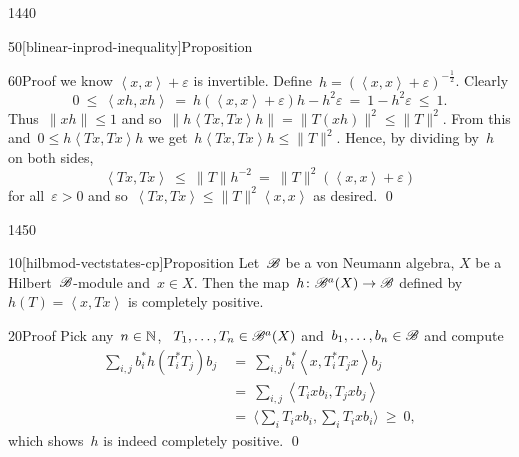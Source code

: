 \begin{parsec}{1440}
\begin{point}{50}[blinear-inprod-inequality]{Proposition}
\begin{point}{60}{Proof}
    we know $\left<x,x\right> + \varepsilon$ is invertible.
Define~$h = (\left<x,x\right> + \varepsilon)^{-\frac{1}{2}}$.
Clearly
\begin{equation*}
0 \ \leq\  \left<xh,xh\right>
    \ =\  h (\left<x,x\right> + \varepsilon)h - h^2 \varepsilon
    \ =\  1 - h^2 \varepsilon \ \leq\  1.
\end{equation*}
Thus~$\|xh\| \leq 1$
and so~$\|h\left<Tx, Tx\right>h\| = \|T(xh)\|^2 \leq \|T\|^2$.
From this and~$0 \leq h\left<Tx,Tx\right>h$
we get~$h\left<Tx,Tx\right>h \leq \|T\|^2$. Hence, by dividing by~$h$
    on both sides,
\begin{equation*}
\left<Tx,Tx\right> \ \leq \ \|T\| h^{-2}\  =
    \  \|T\|^2(\left<x,x\right> + \varepsilon)
\end{equation*}
for all~$\varepsilon > 0$
and so~$\left<Tx,Tx\right> \leq \|T\|^2 \left<x,x\right>$ as desired. \qed
\end{point}
\end{point}
\end{parsec}

\begin{parsec}{1450}%
\begin{point}{10}[hilbmod-vectstates-cp]{Proposition}%
Let~$\mathscr{B}$ be a von Neumann algebra,
    $X$ be a Hilbert~$\mathscr{B}$-module
    and~$x \in X$.
Then the map~$h\colon \mathscr{B}^a(X )\to \mathscr{B}$
defined by~$h(T) = \left<x,Tx\right>$
is completely positive.
\begin{point}{20}{Proof}%
Pick any~$n \in \mathbb{N}$, ~$T_1, \ldots, T_n \in \mathscr{B}^a(X)$
    and~$b_1, \ldots, b_n \in \mathscr{B}$
    and compute
\begin{align*}
\sum_{i,j} b_i^* h(T_i^*T_j)b_j
&\ =\ \sum_{i,j} b_i^* \left<x,T_i^*T_j x\right> b_j\\
&\ =\ \sum_{i,j} \left<T_i x b_i,T_j x b_j\right>  \\
&\ =\ \bigl\langle\sum_i T_i x b_i, \sum_i T_i x b_i\bigr\rangle \ \geq\  0,
\end{align*}
which shows~$h$ is indeed completely positive. \qed
\end{point}
\end{point}
\end{parsec}


